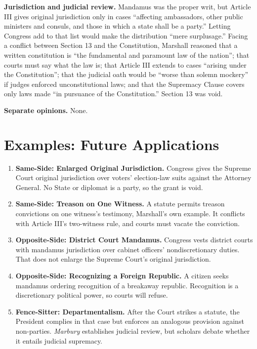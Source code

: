 \documentclass[12pt]{article}
\begin{document}
\textbf{Jurisdiction and judicial review.} Mandamus was the proper writ, but Article III gives original jurisdiction only in cases ``affecting ambassadors, other public ministers and consuls, and those in which a state shall be a party.'' Letting Congress add to that list would make the distribution ``mere surplusage.'' Facing a conflict between Section 13 and the Constitution, Marshall reasoned that a written constitution is ``the fundamental and paramount law of the nation''; that courts must say what the law is; that Article III extends to cases ``arising under the Constitution''; that the judicial oath would be ``worse than solemn mockery'' if judges enforced unconstitutional laws; and that the Supremacy Clause covers only laws made ``in pursuance of the Constitution.'' Section 13 was void.

\textbf{Separate opinions.} None.

\section{Examples: Future Applications}

\begin{enumerate}
\item \textbf{Same-Side: Enlarged Original Jurisdiction.} Congress gives the Supreme Court original jurisdiction over voters' election-law suits against the Attorney General. No State or diplomat is a party, so the grant is void.
\item \textbf{Same-Side: Treason on One Witness.} A statute permits treason convictions on one witness's testimony, Marshall's own example. It conflicts with Article III's two-witness rule, and courts must vacate the conviction.
\item \textbf{Opposite-Side: District Court Mandamus.} Congress vests district courts with mandamus jurisdiction over cabinet officers' nondiscretionary duties. That does not enlarge the Supreme Court's original jurisdiction.
\item \textbf{Opposite-Side: Recognizing a Foreign Republic.} A citizen seeks mandamus ordering recognition of a breakaway republic. Recognition is a discretionary political power, so courts will refuse.
\item \textbf{Fence-Sitter: Departmentalism.} After the Court strikes a statute, the President complies in that case but enforces an analogous provision against non-parties. \textit{Marbury} establishes judicial review, but scholars debate whether it entails judicial supremacy.
\end{enumerate}
\end{document}

